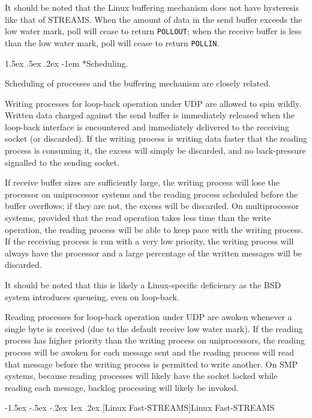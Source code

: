 \documentclass[letterpaper,final,notitlepage,twocolumn,10pt,twoside]{article}
\makeatletter
\renewcommand\subsection{\@startsection{subsection}{2}{\z@}%
                                     {-1.5ex \@plus -.5ex \@minus -.2ex}%
                                     {1ex \@plus .2ex}%
                                     {\normalfont\normalsize\bfseries}}
\renewcommand\paragraph{\@startsection{paragraph}{4}{\z@}%
                                    {1.5ex \@plus .5ex \@minus .2ex}%
                                    {-1em}%
                                    {\normalfont\normalsize\bfseries\slshape}}
\makeatother
\begin{document}
It should be noted that the Linux buffering mechanism does not have hysteresis
like that of STREAMS.  When the amount of data in the send buffer exceeds the
low water mark, poll will cease to return \texttt{POLLOUT}; when the receive
buffer is less than the low water mark, poll will cease to return
\texttt{POLLIN}.

\paragraph*{Scheduling.}

Scheduling of processes and the buffering mechanism are closely related.

Writing processes for loop-back operation under UDP are allowed to spin
wildly.  Written data charged against the send buffer is immediately released
when the loop-back interface is encountered and immediately delivered to the
receiving socket (or discarded).  If the writing process is writing data
faster that the reading process is consuming it, the excess will simply be
discarded, and no back-pressure signalled to the sending socket.

If receive buffer sizes are sufficiently large, the writing process will lose
the processor on uniprocessor systems and the reading process scheduled before
the buffer overflows; if they are not, the excess will be discarded.  On
multiprocessor systems, provided that the read operation takes less time than
the write operation, the reading process will be able to keep pace with the
writing process.  If the receiving process is run with a very low priority,
the writing process will always have the processor and a large percentage of
the written messages will be discarded.

It should be noted that this is likely a Linux-specific deficiency as the BSD
system introduces queueing, even on loop-back.

Reading processes for loop-back operation under UDP are awoken whenever a
single byte is received (due to the default receive low water mark).  If the
reading process has higher priority than the writing process on uniprocessors,
the reading process will be awoken for each message sent and the reading
process will read that message before the writing process is permitted to
write another.  On SMP systems, because reading processes will likely have the
socket locked while reading each message, backlog processing will likely be
invoked.

\subsection[Linux Fast-STREAMS]{Linux Fast-STREAMS}
\end{document}
